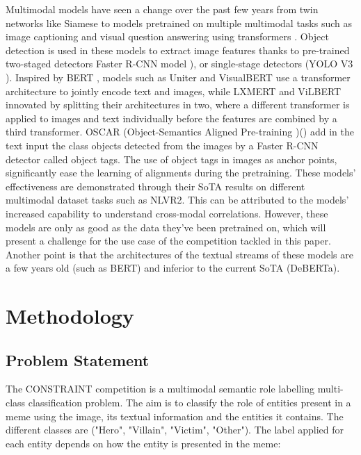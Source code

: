 \documentclass[11pt]{article}
\begin{document}
Multimodal models have seen a change over the past few years from twin networks like Siamese  \cite{gu2018look} to models pretrained on multiple multimodal tasks such as image captioning and visual question answering using transformers \cite{devlin2018bert}. Object detection is used in these models to extract image features thanks to pre-trained two-staged detectors Faster R-CNN model \cite{ren2015faster}), or single-stage detectors (YOLO V3 \cite{adarsh2020yolo}). Inspired by BERT \cite{devlin2018bert}, models such as Uniter \cite{chen2019uniter} and VisualBERT \cite{li2019visualbert} use a transformer architecture to jointly encode text and images, while LXMERT \cite{tan2019lxmert} and ViLBERT \cite{lu2019vilbert} innovated by splitting their architectures in two, where a different transformer is applied to images and text individually before the features are combined by a third transformer. OSCAR (Object-Semantics Aligned Pre-training )(\cite{Li2020OscarOA}) add in the text input the class objects detected from the images by a Faster R-CNN detector called object tags. The use of object tags in images as anchor points, significantly ease the learning of alignments during the pretraining.
These models' effectiveness are demonstrated through their SoTA results on different multimodal dataset tasks such as NLVR2. This can be attributed to the models' increased capability to understand cross-modal correlations. However, these models are only as good as the data they've been pretrained on, which will present a challenge for the use case of the competition tackled in this paper. Another point is that the architectures of the textual streams of these models are a few years old (such as BERT) and inferior to the current SoTA (DeBERTa).

\section{Methodology}

\subsection{Problem Statement}

The CONSTRAINT competition is a multimodal semantic role labelling multi-class classification problem. The aim is to classify the role of entities present in a meme using the image, its textual information and the entities it contains. The different classes are ("Hero", "Villain", "Victim", "Other"). The label applied for each entity depends on how the entity is presented in the meme:
\end{document}
